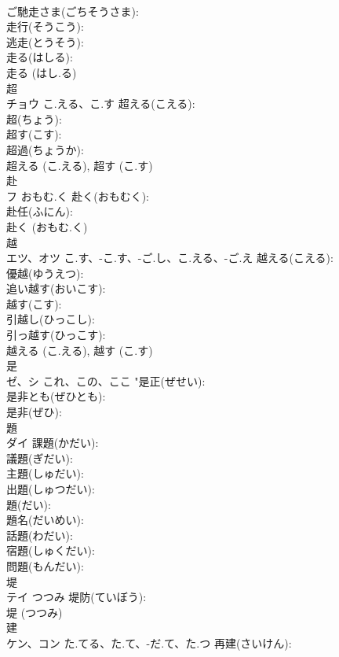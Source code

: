 \documentclass[8pt]{extreport}
\begin{document}
\begin{CJK}{UTF8}{min}
\\	ご馳走さま(ごちそうさま): 
\\	走行(そうこう): 
\\	逃走(とうそう): 
\\	走る(はしる): 
\\	走る (はし.る)
\\	超		
\\	チョウ	こ.える、こ.す	超える(こえる): 
\\	超(ちょう): 
\\	超す(こす): 
\\	超過(ちょうか): 
\\	超える (こ.える), 超す (こ.す)
\\	赴		
\\	フ	おもむ.く	赴く(おもむく): 
\\	赴任(ふにん): 
\\	赴く (おもむ.く)
\\	越			
\\	エツ、オツ	こ.す、-こ.す、-ご.し、こ.える、-ご.え	越える(こえる): 
\\	優越(ゆうえつ): 
\\	追い越す(おいこす): 
\\	越す(こす): 
\\	引越し(ひっこし): 
\\	引っ越す(ひっこす): 
\\	越える (こ.える), 越す (こ.す)
\\	是			
\\	ゼ、シ	これ、この、ここ	"是正(ぜせい): 
\\	是非とも(ぜひとも): 
\\	是非(ぜひ): 
\\	題		
\\	ダイ		課題(かだい): 
\\	議題(ぎだい): 
\\	主題(しゅだい): 
\\	出題(しゅつだい): 
\\	題(だい): 
\\	題名(だいめい): 
\\	話題(わだい): 
\\	宿題(しゅくだい): 
\\	問題(もんだい): 
\\	堤		
\\	テイ	つつみ	堤防(ていぼう): 
\\	堤 (つつみ)
\\	建		
\\	ケン、コン	た.てる、た.て、-だ.て、た.つ	再建(さいけん): 

\end{CJK}
\end{document}
